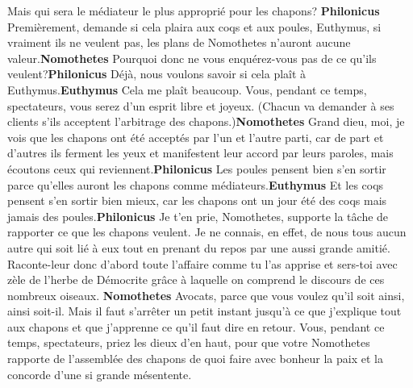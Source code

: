 \documentclass[12pt]{book}
\begin{document}
\begin{pages}
\begin{Rightside}
                        Mais qui sera le médiateur le plus approprié pour les chapons?
                    \pend\pstart\textbf{Philonicus }\hspace{1cm} Premièrement, demande si cela plaira aux coqs et aux poules, Euthymus, si vraiment ils ne veulent pas, les plans de Nomothetes n’auront aucune valeur.\pend\pstart\textbf{Nomothetes }\hspace{1cm} Pourquoi donc ne vous enquérez-vous pas de ce qu’ils veulent?\pend\pstart\textbf{Philonicus }\hspace{1cm} Déjà, nous voulons savoir si cela plaît à Euthymus.\pend\pstart\textbf{Euthymus }\hspace{1cm} Cela me plaît beaucoup. Vous, pendant ce temps, spectateurs, vous serez d’un esprit libre et joyeux. 
                        (Chacun va demander à ses clients s’ils acceptent l’arbitrage des chapons.)\pend\pstart\textbf{Nomothetes }\hspace{1cm} Grand dieu, moi, je vois que les chapons ont été acceptés par l’un et l’autre parti, car de part et d’autres ils ferment les yeux et manifestent leur accord par leurs paroles, mais écoutons ceux qui reviennent.\pend\pstart\textbf{Philonicus }\hspace{1cm} Les poules pensent bien s’en sortir parce qu’elles auront les chapons comme médiateurs.\pend\pstart\textbf{Euthymus }\hspace{1cm} Et les coqs pensent s’en sortir bien mieux, car les chapons ont un jour été des coqs mais jamais des poules.\pend\pstart\textbf{Philonicus }\hspace{1cm} Je t’en prie, Nomothetes, supporte la tâche de rapporter ce que les chapons veulent. Je ne connais, en effet, de nous tous aucun autre qui soit lié à eux tout en prenant du repos par une aussi grande amitié.
                        Raconte-leur donc d’abord toute l’affaire comme tu l’as apprise et sers-toi avec zèle de l’herbe de Démocrite grâce à laquelle on comprend le discours de ces nombreux oiseaux.
                    \pend\pstart\textbf{Nomothetes }\hspace{1cm} Avocats, parce que vous voulez qu’il soit ainsi, ainsi soit-il. 
                        Mais il faut s’arrêter un petit instant jusqu’à ce que j’explique tout aux chapons et que j’apprenne ce qu’il faut dire en retour.
                        Vous, pendant ce temps, spectateurs, priez les dieux d’en haut, pour que votre Nomothetes rapporte de l’assemblée des chapons de quoi faire avec bonheur la paix et la concorde d’une si grande mésentente.
                    \pend
        \endnumbering
        \end{Rightside}
        \end{pages}
        \Pages
        
\end{document}
